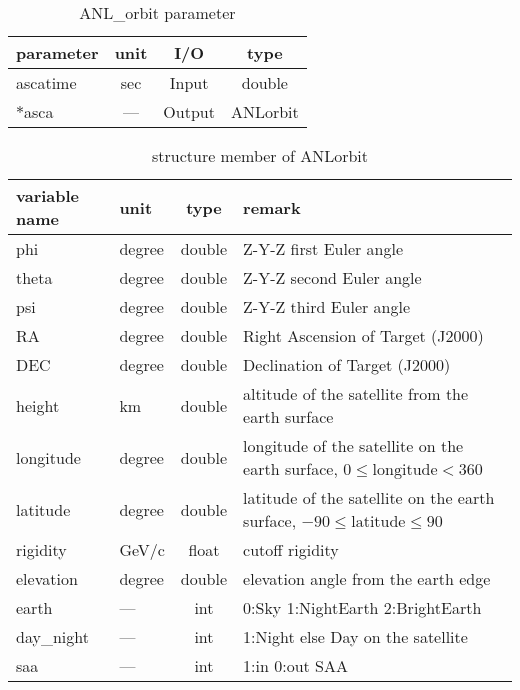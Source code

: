 \begin{table}[htb]
\caption{ANL\_orbit parameter}
\label{tab:orbit-parameter}
\begin{center}
\begin{tabular}{|l|c|c|c|} \hline
parameter    & unit & I/O    & type   \\ \hline
ascatime     & sec  & Input  & double \\
$\ast$asca   & ---  & Output & ANLorbit \\ \hline
\end{tabular}   
\end{center}
\end{table}
 
\begin{table}[htb]
\caption{structure member of ANLorbit}
\label{tab:struct-ANLorbit}
\begin{center}
\begin{tabular}{|l|l|c|l|} \hline
variable name & unit   & type    & remark \\    \hline
phi           & degree & double  & Z-Y-Z first Euler angle \\
theta         & degree & double  & Z-Y-Z second Euler angle \\
psi           & degree & double  & Z-Y-Z third Euler angle \\
RA            & degree & double  & Right Ascension of Target (J2000) \\
DEC           & degree & double  & Declination of Target (J2000) \\
height        & km     & double  & altitude of the satellite from the earth surface\\ 
longitude     & degree & double  & longitude of the satellite on the earth surface, $0\leq\mbox{longitude} < 360$ \\
latitude      & degree & double  & latitude of the satellite on the earth surface, $-90\leq\mbox{latitude}\leq 90$\\
rigidity      & GeV/c  & float   & cutoff rigidity \\ 
elevation     & degree & double  & elevation angle from the earth edge \\
earth         & ---    & int & 0:Sky 1:NightEarth 2:BrightEarth \\
day\_night    & ---    & int & 1:Night else Day on the satellite \\
saa           & ---    & int & 1:in 0:out SAA\\ \hline
\end{tabular}   
\end{center}
\end{table}

